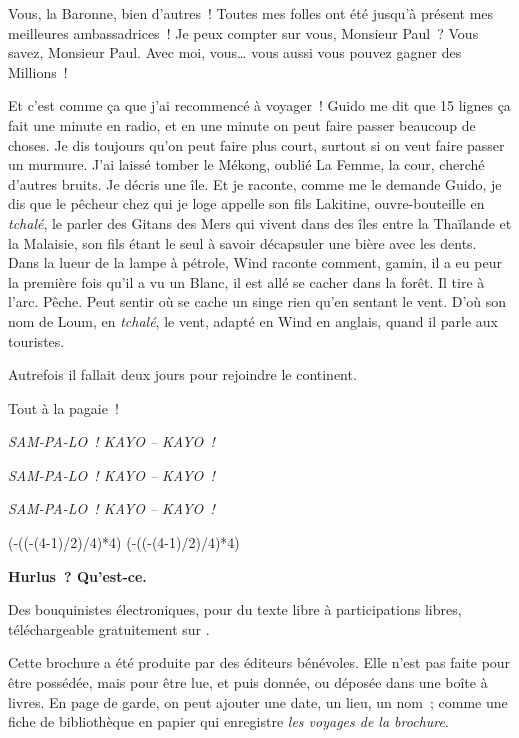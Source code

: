 \documentclass[twoside]{book} %
\def\truncdiv#1#2{((#1-(#2-1)/2)/#2)}
\def\moduloop#1#2{(#1-\truncdiv{#1}{#2}*#2)}
\def\modulo#1#2{\number\numexpr\moduloop{#1}{#2}\relax}
\begin{document}
Vous, la Baronne, bien d’autres ! Toutes mes folles ont été jusqu’à présent mes meilleures ambassadrices ! Je peux compter sur vous, Monsieur Paul ? Vous savez, Monsieur Paul. Avec moi, vous… vous aussi vous pouvez gagner des Millions !\par
\bigbreak
\noindent Et c’est comme ça que j’ai recommencé à voyager ! Guido me dit que 15 lignes ça fait une minute en radio, et en une minute on peut faire passer beaucoup de choses. Je dis toujours qu’on peut faire plus court, surtout si on veut faire passer un murmure. J’ai laissé tomber le Mékong, oublié La Femme, la cour, cherché d’autres bruits. Je décris une île. Et je raconte, comme me le demande Guido, je dis que le pêcheur chez qui je loge appelle son fils Lakitine, ouvre-bouteille en\emph{ tchalé}, le parler des Gitans des Mers qui vivent dans des îles entre la Thaïlande et la Malaisie, son fils étant le seul à savoir décapsuler une bière avec les dents. Dans la lueur de la lampe à pétrole, Wind raconte comment, gamin, il a eu peur la première fois qu’il a vu un Blanc, il est allé se cacher dans la forêt. Il tire à l’arc. Pêche. Peut sentir où se cache un singe rien qu’en sentant le vent. D’où son nom de Loum, en \emph{tchalé}, le vent, adapté en Wind en anglais, quand il parle aux touristes.\par
Autrefois il fallait deux jours pour rejoindre le continent.\par
Tout à la pagaie !\par
\bigbreak
{\centering\itshape \noindent SAM-PA-LO ! KAYO – KAYO !\par}
{\centering\itshape \noindent SAM-PA-LO ! KAYO – KAYO !\par}
{\centering\itshape \noindent SAM-PA-LO ! KAYO – KAYO !\par}
 


\ifbooklet
  \pagestyle{empty}
  \clearpage
  \ifnum\modulo{\value{page}}{4}=0 \hbox{}\newpage\hbox{}\newpage\fi
  \ifnum\modulo{\value{page}}{4}=1 \hbox{}\newpage\hbox{}\newpage\fi


  \hbox{}\newpage
  \ifodd\value{page}\hbox{}\newpage\fi
  {\centering\color{rubric}\bfseries\noindent\large
    Hurlus ? Qu’est-ce.\par
    \bigskip
  }
  \noindent Des bouquinistes électroniques, pour du texte libre à participations libres,
  téléchargeable gratuitement sur \href{https://hurlus.fr}{}.\par
  \bigskip
  \noindent Cette brochure a été produite par des éditeurs bénévoles.
  Elle n’est pas faite pour être possédée, mais pour être lue, et puis donnée, ou déposée dans une boîte à livres.
  En page de garde, on peut ajouter une date, un lieu, un nom ;
  comme une fiche de bibliothèque en papier qui enregistre \emph{les voyages de la brochure}.
  \par
\end{document}
